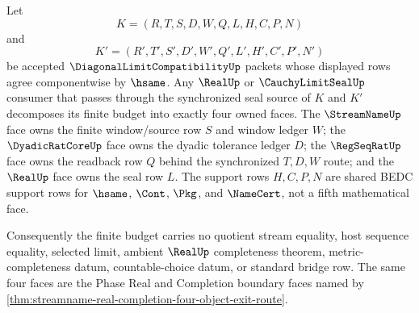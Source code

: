 \begin{theorem}
\label{thm:diagonal-limit-compatibility-four-face-budget-ownership}
Let
$$
K=(R,T,S,D,W,Q,L,H,C,P,N)
$$
and
$$
K'=(R',T',S',D',W',Q',L',H',C',P',N')
$$
be accepted $\DiagonalLimitCompatibilityUp$ packets whose displayed rows agree
componentwise by $\hsame$. Any $\RealUp$ or $\CauchyLimitSealUp$ consumer that
passes through the synchronized seal source of $K$ and $K'$ decomposes its
finite budget into exactly four owned faces. The $\StreamNameUp$ face owns the
finite window/source row $S$ and window ledger $W$; the $\DyadicRatCoreUp$ face
owns the dyadic tolerance ledger $D$; the $\RegSeqRatUp$ face owns the readback
row $Q$ behind the synchronized $T,D,W$ route; and the $\RealUp$ face owns the
seal row $L$. The support rows $H,C,P,N$ are shared BEDC support rows for
$\hsame$, $\Cont$, $\Pkg$, and $\NameCert$, not a fifth mathematical face.

Consequently the finite budget carries no quotient stream equality, host
sequence equality, selected limit, ambient $\RealUp$ completeness theorem,
metric-completeness datum, countable-choice datum, or standard bridge row. The
same four faces are the Phase Real and Completion boundary faces named by
\autoref{thm:streamname-real-completion-four-object-exit-route}.
\end{theorem}
